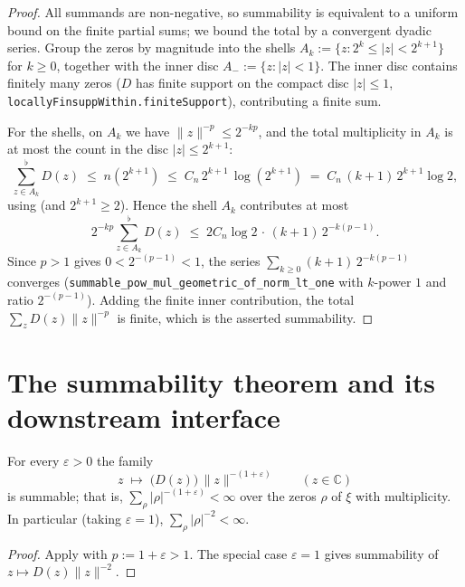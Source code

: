 \begin{proof}
\leanok
{}
All summands are non-negative, so summability is equivalent to a uniform bound on the
finite partial sums; we bound the total by a convergent dyadic series. Group the zeros
by magnitude into the shells $A_k:=\{z:2^{k}\le|z|<2^{k+1}\}$ for $k\ge0$, together with
the inner disc $A_{-}:=\{z:|z|<1\}$. The inner disc contains finitely many zeros
($D$ has finite support on the compact disc $|z|\le1$,
\texttt{locallyFinsuppWithin.finiteSupport}), contributing a finite sum.

For the shells, on $A_k$ we have $\|z\|^{-p}\le 2^{-kp}$, and the total multiplicity in
$A_k$ is at most the count in the disc $|z|\le2^{k+1}$:
\[
  \sum_{z\in A_k}^{\flat} D(z)\;\le\;n\!\left(2^{k+1}\right)\;\le\;C_n\,2^{k+1}\,\log\!\left(2^{k+1}\right)
  \;=\;C_n\,(k+1)\,2^{k+1}\log2,
\]
using  (and $2^{k+1}\ge2$). Hence the shell $A_k$ contributes at
most
\[
  2^{-kp}\sum_{z\in A_k}^{\flat} D(z)\;\le\;2C_n\log2\,\cdot\,(k+1)\,2^{-k(p-1)} .
\]
Since $p>1$ gives $0<2^{-(p-1)}<1$, the series $\sum_{k\ge0}(k+1)\,2^{-k(p-1)}$ converges
(\texttt{summable\_pow\_mul\_geometric\_of\_norm\_lt\_one} with $k$-power $1$ and ratio
$2^{-(p-1)}$). Adding the finite inner contribution, the total $\sum_z D(z)\|z\|^{-p}$ is
finite, which is the asserted summability.
\end{proof}

\section{The summability theorem and its downstream interface}
\label{sec:zs_main}

\begin{theorem}
\label{thm:zs_main}
\leanok
{}
For every $\varepsilon>0$ the family
\[
  z\;\longmapsto\;\bigl(D(z)\bigr)\,\|z\|^{-(1+\varepsilon)}\qquad(z\in\mathbb C)
\]
is summable; that is, $\sum_\rho|\rho|^{-(1+\varepsilon)}<\infty$ over the zeros $\rho$ of
$\xi$ with multiplicity. In particular (taking $\varepsilon=1$),
$\sum_\rho|\rho|^{-2}<\infty$.
\end{theorem}

\begin{proof}
\leanok
{}
Apply  with $p:=1+\varepsilon>1$. The special case
$\varepsilon=1$ gives summability of $z\mapsto D(z)\|z\|^{-2}$.
\end{proof}


